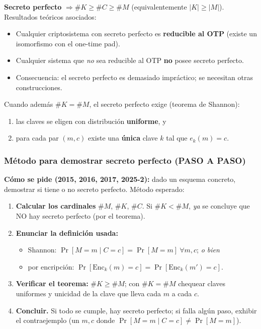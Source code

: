 \documentclass[../main.tex]{subfiles}
\begin{document}
\begin{destacado}
\textbf{Secreto perfecto} $\Rightarrow \#K \ge \#C \ge \#M$
(equivalentemente $|K| \ge |M|$).\\
Resultados teóricos asociados:
\begin{itemize}[nosep]
  \item Cualquier criptosistema con secreto perfecto es \textbf{reducible al
        OTP} (existe un isomorfismo con el one-time pad).
  \item Cualquier sistema que \emph{no} sea reducible al OTP \textbf{no} posee
        secreto perfecto.
  \item Consecuencia: el secreto perfecto es demasiado impráctico; se necesitan
        otras construcciones.
\end{itemize}
\end{destacado}

Cuando además $\#K = \#M$, el secreto perfecto exige (teorema de Shannon):
\begin{enumerate}[nosep]
  \item las claves se eligen con distribución \textbf{uniforme}, y
  \item para cada par $(m,c)$ existe una \textbf{única} clave $k$ tal que
        $e_k(m)=c$.
\end{enumerate}

\subsubsection{Método para demostrar secreto perfecto (PASO A PASO)}

\begin{examen}
\textbf{Cómo se pide (2015, 2016, 2017, 2025-2):} dado un esquema concreto,
demostrar si tiene o no secreto perfecto. Método esperado:
\begin{enumerate}
  \item \textbf{Calcular los cardinales} $\#M$, $\#K$, $\#C$. Si $\#K < \#M$,
        \emph{ya} se concluye que NO hay secreto perfecto (por el teorema).
  \item \textbf{Enunciar la definición usada:}
        \begin{itemize}[nosep]
          \item Shannon: $\Pr[M=m\mid C=c]=\Pr[M=m]\ \forall m,c$; \emph{o bien}
          \item por encripción: $\Pr[\text{Enc}_k(m)=c]=\Pr[\text{Enc}_k(m')=c]$.
        \end{itemize}
  \item \textbf{Verificar el teorema:} $\#K \ge \#M$; con $\#K=\#M$ chequear
        claves uniformes y unicidad de la clave que lleva cada $m$ a cada $c$.
  \item \textbf{Concluir.} Si todo se cumple, hay secreto perfecto; si falla
        algún paso, exhibir el contraejemplo (un $m,c$ donde
        $\Pr[M=m\mid C=c]\neq\Pr[M=m]$).
\end{enumerate}
\end{examen}
\end{document}
